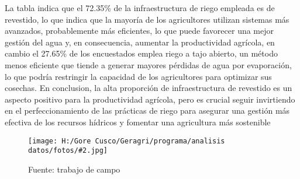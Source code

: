 \documentclass{article}\usepackage[]{graphicx}\usepackage[table]{xcolor}
\newenvironment{fotos}[2]
{\begin{figure}[H]
	\centering
	\caption{#1}
	\texttt{[image: H:/Gore Cusco/Geragri/programa/analisis datos/fotos/\#2.jpg]}
	\caption*{Fuente: trabajo de campo}}
{\end{figure}}
\begin{document}
La tabla indica que el 72.35\% de la infraestructura de riego empleada es de revestido, lo que indica que la mayoría de los agricultores utilizan sistemas más avanzados, probablemente más eficientes, lo que puede favorecer una mejor gestión del agua y, en consecuencia, aumentar la productividad agrícola, en cambio el 27.65\% de los encuestados emplea riego a tajo abierto, un método menos eficiente que tiende a generar mayores pérdidas de agua por evaporación, lo que podría restringir la capacidad de los agricultores para optimizar sus cosechas. En conclusion, la alta proporción de infraestructura de revestido es un aspecto positivo para la productividad agrícola, pero es crucial seguir invirtiendo en el perfeccionamiento de las prácticas de riego para asegurar una gestión más efectiva de los recursos hídricos y fomentar una agricultura más sostenible


\begin{fotos}
{reconocimiento en campo}{21}
\end{fotos}
\end{document}
